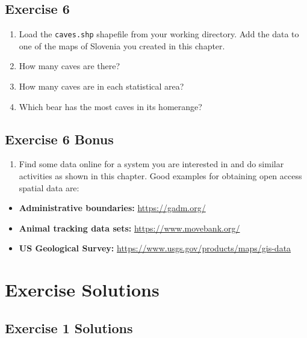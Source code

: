 \documentclass[]{book}
\providecommand{\tightlist}{%
  \setlength{\itemsep}{0pt}\setlength{\parskip}{0pt}}
\theoremstyle{definition}
\theoremstyle{definition}
\theoremstyle{definition}
\theoremstyle{remark}
\begin{document}
\section*{Exercise 6}\label{ex6}

\begin{enumerate}
\def\labelenumi{\arabic{enumi}.}
\tightlist
\item
  Load the \texttt{caves.shp} shapefile \citep{caves-cite} from your
  working directory. Add the data to one of the maps of Slovenia you
  created in this chapter.
\item
  How many caves are there?
\item
  How many caves are in each statistical area?
\item
  Which bear has the most caves in its homerange?
\end{enumerate}

\section*{Exercise 6 Bonus}\label{exercise-6-bonus}

\begin{enumerate}
\def\labelenumi{\arabic{enumi}.}
\tightlist
\item
  Find some data online for a system you are interested in and do
  similar activities as shown in this chapter. Good examples for
  obtaining open access spatial data are:
\end{enumerate}

\begin{itemize}
\tightlist
\item
  \textbf{Administrative boundaries:} \url{https://gadm.org/}
\item
  \textbf{Animal tracking data sets:} \url{https://www.movebank.org/}
\item
  \textbf{US Geological Survey:}
  \url{https://www.usgs.gov/products/maps/gis-data}
\end{itemize}

\chapter*{Exercise Solutions}\label{exercise-solutions}

\hypertarget{ex2-answers}{\section*{Exercise 1
Solutions}\label{ex2-answers}}
\end{document}
